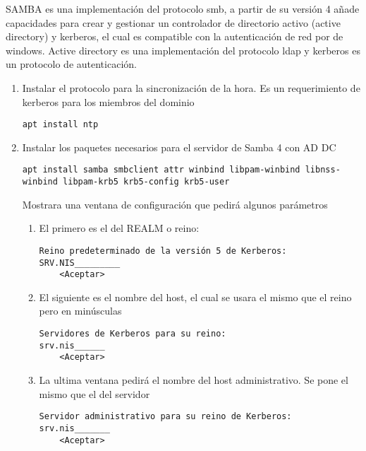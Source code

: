 \documentclass[../main.tex]{subfiles}
\begin{document}
SAMBA es una implementación del protocolo smb, a partir de su
versión 4 añade capacidades para crear y gestionar un controlador
de directorio activo (active directory) y kerberos, el cual es
compatible con la autenticación de red por de windows. Active
directory es una implementación del protocolo ldap y kerberos
es un protocolo de autenticación.

\begin{enumerate}
\item Instalar el protocolo para la sincronización de la hora.
  Es un requerimiento de kerberos para los miembros del dominio

  \begin{lstlisting}
apt install ntp
\end{lstlisting}

  \item Instalar los paquetes necesarios para el servidor de
    Samba 4 con AD DC

    \begin{lstlisting}
apt install samba smbclient attr winbind libpam-winbind libnss-winbind libpam-krb5 krb5-config krb5-user
\end{lstlisting}

  Mostrara una ventana de configuración que pedirá algunos parámetros

  \begin{enumerate}
  \item El primero es el del REALM o reino:

    \begin{lstlisting}
Reino predeterminado de la versión 5 de Kerberos:
SRV.NIS_________
    <Aceptar>
  \end{lstlisting}

  
   \item El siguiente es el nombre del host, el cual se usara el mismo
     que el reino pero en minúsculas

     \begin{lstlisting}
Servidores de Kerberos para su reino:
srv.nis______
    <Aceptar>
\end{lstlisting}

    \item La ultima ventana pedirá el nombre del host administrativo.
      Se pone el mismo que el del servidor

      \begin{lstlisting}
Servidor administrativo para su reino de Kerberos:
srv.nis_______
    <Aceptar>
\end{lstlisting}



\end{enumerate}
\end{enumerate}
\end{document}
